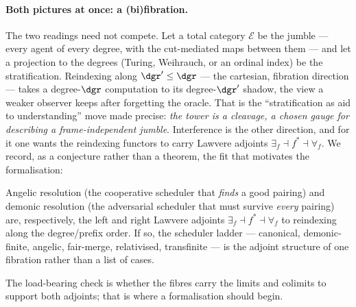 \paragraph{Both pictures at once: a (bi)fibration.}
The two readings need not compete. Let a total category $\mathcal{E}$ be the
jumble --- every agent of every degree, with the cut-mediated maps between them ---
and let a projection to the degrees (Turing, Weihrauch, or an ordinal index) be
the stratification. Reindexing along $\dgr' \le \dgr$ --- the cartesian, fibration
direction --- takes a degree-$\dgr$ computation to its degree-$\dgr'$ shadow, the
view a weaker observer keeps after forgetting the oracle. That is the
``stratification as aid to understanding'' move made precise: \emph{the tower is a
cleavage, a chosen gauge for describing a frame-independent jumble}. Interference
is the other direction, and for it one wants the reindexing functors to carry
Lawvere adjoints $\exists_f \dashv f^{*} \dashv \forall_f$. We record, as a
conjecture rather than a theorem, the fit that motivates the formalisation:

\begin{conjecture}\label{ndo:conj:adjoint}
Angelic resolution (the cooperative scheduler that \emph{finds} a good pairing)
and demonic resolution (the adversarial scheduler that must survive \emph{every}
pairing) are, respectively, the left and right Lawvere adjoints
$\exists_f \dashv f^{*} \dashv \forall_f$ to reindexing along the
degree/prefix order. If so, the scheduler ladder --- canonical, demonic-finite,
angelic, fair-merge, relativised, transfinite --- is the adjoint structure of one
fibration rather than a list of cases.
\end{conjecture}

\noindent
The load-bearing check is whether the fibres carry the limits and colimits to
support both adjoints; that is where a formalisation should begin.

